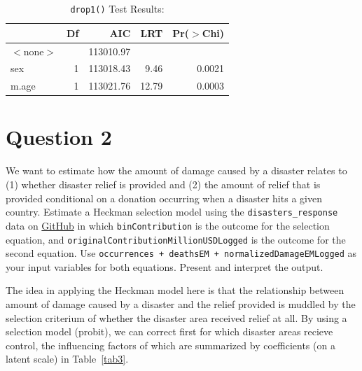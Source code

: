 \documentclass[12pt,letterpaper]{article}
\begin{document}
	

\begin{table}[ht]
	\centering
	\caption{\texttt{drop1()} Test Results:} 
	\label{tab2} 
	\begin{tabular}{lrrrr}
		\hline
		& Df & AIC & LRT & Pr($>$Chi) \\ 
		\hline
		$<$none$>$ &  & 113010.97 &  &  \\ 
		sex & 1 & 113018.43 & 9.46 & 0.0021 \\ 
		m.age & 1 & 113021.76 & 12.79 & 0.0003 \\ 
		\hline
	\end{tabular}
\end{table}


\newpage

\section*{Question 2}
\vspace{.25cm}
\noindent We want to estimate how the amount of damage caused by a disaster relates to (1) whether disaster relief is provided and (2) the amount of relief that is provided  conditional on a donation occurring when a disaster hits a given country. Estimate a Heckman selection model using the \texttt{disasters\_response} data on \href{https://raw.githubusercontent.com/ASDS-TCD/StatsII_2026/refs/heads/main/datasets/disaster_response.csv}{GitHub} in which \texttt{binContribution} is the outcome for the selection equation, and \texttt{originalContributionMillionUSDLogged} is the outcome for the second equation. Use \texttt{occurrences  + deathsEM + normalizedDamageEMLogged} as your input variables for both equations. Present and interpret the output.
\vspace{0.2cm}

The idea in applying the Heckman model here is that the relationship between amount of damage caused by a disaster and the relief provided is muddled by the selection criterium of whether the disaster area received relief at all. By using a selection model (probit), we can correct first for which disaster areas recieve control, the influencing factors of which are summarized by coefficients (on a latent scale) in Table~\ref{tab3}.

	
	
\end{document}
